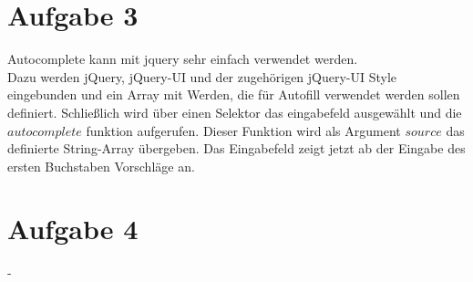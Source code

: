 \documentclass[12pt, a4paper]{report}
\begin{document}
\section*{Aufgabe 3}
Autocomplete kann mit jquery sehr einfach verwendet werden.\\
Dazu werden jQuery, jQuery-UI und der zugehörigen jQuery-UI Style eingebunden und ein Array mit Werden, die für Autofill verwendet werden sollen definiert. Schließlich wird über einen Selektor das eingabefeld ausgewählt und die $autocomplete$ funktion aufgerufen. Dieser Funktion wird als Argument $source$ das definierte String-Array übergeben. Das Eingabefeld zeigt jetzt ab der Eingabe des ersten Buchstaben Vorschläge an.




\section*{Aufgabe 4}
-
\end{document}
